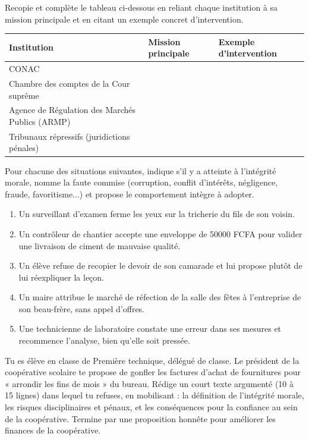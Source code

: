 \documentclass[11pt]{article}
\newcounter{popsec}
\newcounter{popsub}
\newcommand{\courssub}[1]{%
  \stepcounter{popsub}%
  \par\vspace{9pt}\noindent{\popxbold\fontsize{11.5}{13}\selectfont\color{popink}{\color{poporange}\thepopsec.\thepopsub}\hspace{6pt}#1}\par\nopagebreak\vspace{4pt}
}
\begin{document}
\begin{exercice}
Recopie et complète le tableau ci-dessous en reliant chaque institution à sa mission principale et en citant un exemple concret d'intervention.

\begin{center}
\begin{tabularx}{\linewidth}{|l|X|X|}\hline
\rowcolor{popblueL} \textbf{Institution} & \textbf{Mission principale} & \textbf{Exemple d'intervention} \\ \hline
CONAC & & \\ \hline
Chambre des comptes de la Cour suprême & & \\ \hline
Agence de Régulation des Marchés Publics (ARMP) & & \\ \hline
Tribunaux répressifs (juridictions pénales) & & \\ \hline
\end{tabularx}
\end{center}
\end{exercice}

\courssub{Je m'entraîne}

\begin{exercice}
Pour chacune des situations suivantes, indique s'il y a atteinte à l'intégrité morale, nomme la faute commise (corruption, conflit d'intérêts, négligence, fraude, favoritisme...) et propose le comportement intègre à adopter.
\begin{enumerate}
\item Un surveillant d'examen ferme les yeux sur la tricherie du fils de son voisin.
\item Un contrôleur de chantier accepte une enveloppe de \num{50000} FCFA pour valider une livraison de ciment de mauvaise qualité.
\item Un élève refuse de recopier le devoir de son camarade et lui propose plutôt de lui réexpliquer la leçon.
\item Un maire attribue le marché de réfection de la salle des fêtes à l'entreprise de son beau-frère, sans appel d'offres.
\item Une technicienne de laboratoire constate une erreur dans ses mesures et recommence l'analyse, bien qu'elle soit pressée.
\end{enumerate}
\end{exercice}

\begin{exercice}
Tu es élève en classe de Première technique, délégué de classe. Le président de la coopérative scolaire te propose de gonfler les factures d'achat de fournitures pour « arrondir les fins de mois » du bureau. Rédige un court texte argumenté (10 à 15 lignes) dans lequel tu refuses, en mobilisant : la définition de l'intégrité morale, les risques disciplinaires et pénaux, et les conséquences pour la confiance au sein de la coopérative. Termine par une proposition honnête pour améliorer les finances de la coopérative.
\end{exercice}
\end{document}
